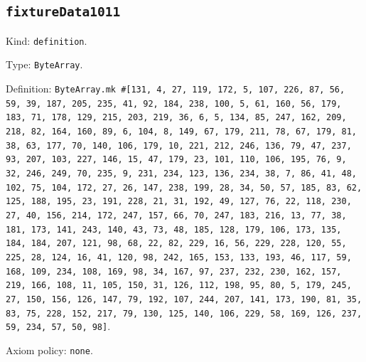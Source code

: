 \documentclass[11pt]{article}
\begin{document}
\subsection*{\texttt{fixtureData1011}}
\noindent Kind: \texttt{definition}.\par
\noindent Type: \texttt{ByteArray}.\par
\noindent Definition: \texttt{ByteArray.mk \#[131, 4, 27, 119, 172, 5, 107, 226, 87, 56, 59, 39, 187, 205, 235, 41, 92, 184, 238, 100, 5, 61, 160, 56, 179, 183, 71, 178, 129, 215, 203, 219, 36, 6, 5, 134, 85, 247, 162, 209, 218, 82, 164, 160, 89, 6, 104, 8, 149, 67, 179, 211, 78, 67, 179, 81, 38, 63, 177, 70, 140, 106, 179, 10, 221, 212, 246, 136, 79, 47, 237, 93, 207, 103, 227, 146, 15, 47, 179, 23, 101, 110, 106, 195, 76, 9, 32, 246, 249, 70, 235, 9, 231, 234, 123, 136, 234, 38, 7, 86, 41, 48, 102, 75, 104, 172, 27, 26, 147, 238, 199, 28, 34, 50, 57, 185, 83, 62, 125, 188, 195, 23, 191, 228, 21, 31, 192, 49, 127, 76, 22, 118, 230, 27, 40, 156, 214, 172, 247, 157, 66, 70, 247, 183, 216, 13, 77, 38, 181, 173, 141, 243, 140, 43, 73, 48, 185, 128, 179, 106, 173, 135, 184, 184, 207, 121, 98, 68, 22, 82, 229, 16, 56, 229, 228, 120, 55, 225, 28, 124, 16, 41, 120, 98, 242, 165, 153, 133, 193, 46, 117, 59, 168, 109, 234, 108, 169, 98, 34, 167, 97, 237, 232, 230, 162, 157, 219, 166, 108, 11, 105, 150, 31, 126, 112, 198, 95, 80, 5, 179, 245, 27, 150, 156, 126, 147, 79, 192, 107, 244, 207, 141, 173, 190, 81, 35, 83, 75, 228, 152, 217, 79, 130, 125, 140, 106, 229, 58, 169, 126, 237, 59, 234, 57, 50, 98]}.\par
\noindent Axiom policy: \texttt{none}.\par
\end{document}
